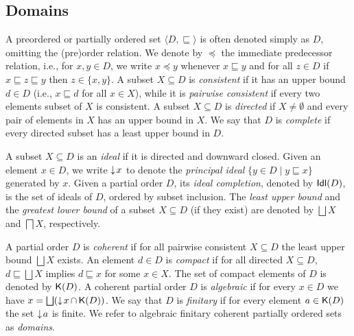 \subsection{Domains}
\label{ss:domains}

A preordered or partially ordered set $\langle D, \sqsubseteq \rangle$
is often denoted simply as $D$, omitting the (pre)order
relation.  We denote by
$\preceq$ the immediate predecessor relation, i.e., for $x, y \in D$, 
we write $x \preceq y$ whenever
$x \sqsubseteq y$ and for all $z \in D$ if
$x \sqsubseteq z \sqsubseteq y$ then $z \in \{x,y\}$.
%
A subset $X \subseteq D$ is \emph{consistent}
if it has an upper bound $d \in D$  (i.e., $x \sqsubseteq d$ for all $x \in X$),
while it is \emph{pairwise consistent} if
every two elements subset 
of $X$ is consistent.
%
A subset $X \subseteq D$ is \emph{directed} if $X \neq \emptyset$ and
every pair of elements in $X$ has an upper bound in $X$. We say that
$D$ is \emph{complete} if every directed subset has a least upper
bound in $D$.

A subset $X \subseteq D$ is an \emph{ideal} if it is directed and
downward closed.
%
Given an element $x \in D$, we write $\mathop{\downarrow\!{x}}$ to
denote the \emph{principal ideal} $\{ y \in D \mid y \sqsubseteq x \}$ generated by $x$.
Given a partial order $D$, its \emph{ideal completion}, denoted by $\mathsf{Idl}({D})$, is the
set of ideals of $D$,  ordered by subset inclusion.
%
The \emph{least upper bound} and the \emph{greatest lower bound} of a
subset $X \subseteq D$ (if they exist) are denoted by $\bigsqcup X$
and $\bigsqcap X$, respectively.

\begin{definition}[domains]
  \label{c-de:domain}
  A partial order $D$ is \emph{coherent} if for all
  pairwise  consistent $X \subseteq D$ the least
  upper bound $\bigsqcup X$ exists. 
  An element $d \in D$ is \emph{compact} if for all directed
  $X \subseteq D$, $d \sqsubseteq \bigsqcup X$ implies
  $d \sqsubseteq x$ for some $x \in X$. The set of compact
  elements of $D$ is denoted by $\mathop{\mathsf{K}({D})}$.
  A coherent partial order $D$ is \emph{algebraic}
  if for every $x \in D$ we have
  $x = \bigsqcup (\mathop{\downarrow\!{x}} \cap \mathop{\mathsf{K}({D})})$.  We say that $D$
  is \emph{finitary} if for every element $a \in \mathop{\mathsf{K}({D})}$ the set
  $\mathop{\downarrow\!{a}}$ is finite.
  We refer to 
  algebraic finitary coherent partially ordered sets as
  \emph{domains}.
\end{definition}

